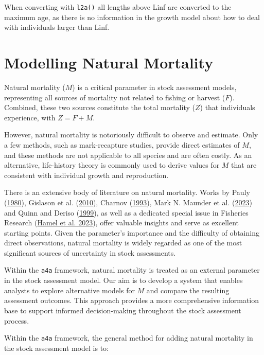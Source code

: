 \documentclass[
]{book}
\begin{document}
When converting with \texttt{l2a()} all lengths above Linf are converted to the maximum age, as there is no information in the growth model about how to deal with individuals larger than Linf.

\hypertarget{modelling-natural-mortality}{%
\chapter{Modelling Natural Mortality}\label{modelling-natural-mortality}}

Natural mortality (\(M\)) is a critical parameter in stock assessment models, representing all sources of mortality not related to fishing or harvest (\(F\)). Combined, these two sources constitute the total mortality (\(Z\)) that individuals experience, with \(Z = F + M\).

However, natural mortality is notoriously difficult to observe and estimate. Only a few methods, such as mark-recapture studies, provide direct estimates of \(M\), and these methods are not applicable to all species and are often costly. As an alternative, life-history theory is commonly used to derive values for \(M\) that are consistent with individual growth and reproduction.

There is an extensive body of literature on natural mortality. Works by Pauly (\protect\hyperlink{ref-pauly1980}{1980}), Gislason et al. (\protect\hyperlink{ref-gislason2010}{2010}), Charnov (\protect\hyperlink{ref-charnov1993}{1993}), Mark N. Maunder et al. (\protect\hyperlink{ref-maunder2023mrev}{2023}) and Quinn and Deriso (\protect\hyperlink{ref-quinn1999}{1999}), as well as a dedicated special issue in Fisheries Research (\protect\hyperlink{ref-MCAPAM2023}{Hamel et al. 2023}), offer valuable insights and serve as excellent starting points. Given the parameter's importance and the difficulty of obtaining direct observations, natural mortality is widely regarded as one of the most significant sources of uncertainty in stock assessments.

Within the \texttt{a4a} framework, natural mortality is treated as an external parameter in the stock assessment model. Our aim is to develop a system that enables analysts to explore alternative models for \(M\) and compare the resulting assessment outcomes. This approach provides a more comprehensive information base to support informed decision-making throughout the stock assessment process.

Within the \texttt{a4a} framework, the general method for adding natural mortality in the stock assessment model is to:
\end{document}
